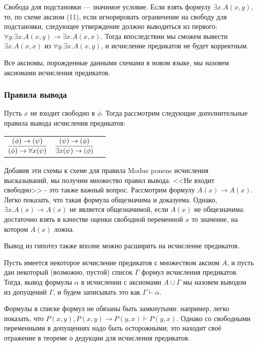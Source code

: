 Свобода для подстановки --- значимое условие. Если взять формулу $\exists x. A(x,y)$, то, по схеме аксиом (11), если игнорировать ограничение на свободу для подстановки, следующее утверждение должно выводиться из первого: 
$\forall y. \exists x. A(x,y) \rightarrow \exists x. A (x,x)$. Тогда впоследствии мы сможем вывести $\exists x. A (x,x)$ из $\forall y. \exists x. A(x,y)$, и исчисление предикатов не будет корректным.

Все аксиомы, порожденные данными схемами в новом языке, мы назовем аксиомами исчисления предикатов.

\subsubsection*{Правила вывода}

Пусть $x$ не входит свободно в $\phi$. Тогда рассмотрим следующие дополнительные
правила вывода исчисления предикатов:

\begin{tabular}{lll}
$\infer{(\phi) \rightarrow \forall{x}(\psi)}{(\phi) \rightarrow (\psi)}$ &
$\infer{\exists{x}(\psi) \rightarrow (\phi)}{(\psi) \rightarrow (\phi)}$
\end{tabular}

Добавив эти схемы к схеме для правила Modus ponens исчисления высказываний,
мы получим множество правил вывода.
<<Не входит свободно>> - это также важный вопрос.
Рассмотрим формулу $A(x) \rightarrow A(x)$. Легко показать, что такая
формула общезначима и доказуема. Однако, $\exists x. A(x) \rightarrow A(x)$
не является общезначимой, если $A(x)$ не общезначима: достаточно взять в качестве оценки свободной переменной $x$ то значение, на котором $A(x)$ ложна.


Вывод из гипотез также вполне можно расширить на исчисление предикатов.
\begin{definition}
Пусть имеется некоторое исчисление предикатов с множеством
аксиом $A$, и пусть дан некоторый (возможно, пустой) список $\Gamma$ 
формул исчисления предикатов. Тогда, вывод формулы $\alpha$
в исчислении с аксиомами $A \cup \Gamma$ мы назовем выводом из 
допущений $\Gamma$, и будем записывать это как $\Gamma \vdash \alpha$.
\end{definition}

Формулы в списке формул не обязаны быть замкнутыми: например, легко 
показать, что $P(x,y), P(x,y)\rightarrow P(y,x) \vdash P(y,x)$. Однако
со свободными переменными в допущениях надо быть осторожными; это 
находит своё отражение в теореме о дедукции для исчисления предикатов.

